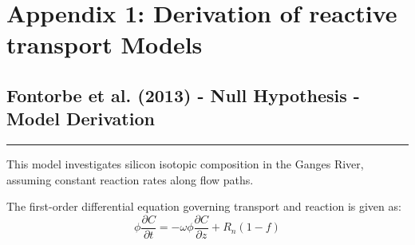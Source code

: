 
\section{Appendix 1: Derivation of reactive transport Models}


\begin{tcolorbox}[
    colback=white,
    colframe=white,
    sharp corners,
    boxrule=0pt,
    breakable,
    width=\dimexpr\textwidth+1cm\relax,
    enlarge left by=-0.5cm,
    leftrule=0mm, rightrule=0mm, toprule=0mm, bottomrule=0mm
]


\subsection{Fontorbe et al. (2013) - Null Hypothesis - Model Derivation}
\vspace{-5mm}
{\footnotesize

\noindent\rule{\textwidth}{0.5pt}

This model investigates silicon isotopic composition in the Ganges River, assuming constant reaction rates along flow paths.

\begin{multicols}{2}

    The first-order differential equation governing transport and reaction is given as:
    \vspace{10mm}
    \columnbreak
    \begin{equation}
    \phi \frac{\partial C}{\partial t} = -\omega \phi \frac{\partial C}{\partial z} + R_n(1-f)
    \end{equation} 
    
\end{multicols}

    
}
\end{tcolorbox}
